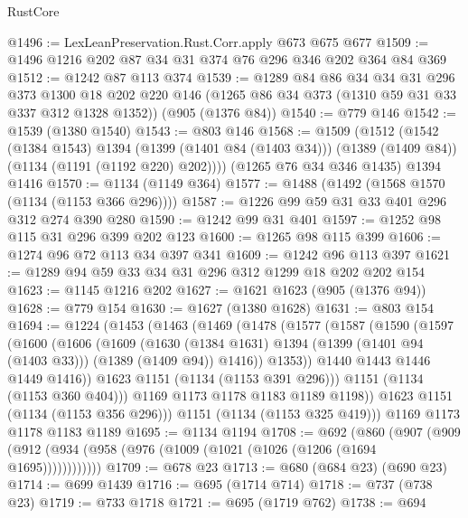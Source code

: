 \begin{lexlean}{RustCore}
\begin{coremodule}
@1496 := LexLeanPreservation.Rust.Corr.apply @673 @675 @677
@1509 := @1496 @1216 @202 @87 @34 @31 @374 @76 @296 @346 @202 @364 @84 @369
@1512 := @1242 @87 @113 @374
@1539 := @1289
    @84
    @86
    @34
    @34
    @31
    @296
    @373
    @1300
    @18
    @202
    @220
    @146
    (@1265 @86 @34 @373 (@1310 @59 @31 @33 @337 @312 @1328 @1352))
    (@905 (@1376 @84))
@1540 := @779 @146
@1542 := @1539 (@1380 @1540)
@1543 := @803 @146
@1568 := @1509
    (@1512
      (@1542
        (@1384 @1543)
        @1394
        (@1399 (@1401 @84 (@1403 @34)))
        (@1389 (@1409 @84))
        (@1134 (@1191 (@1192 @220) @202))))
    (@1265 @76 @34 @346 @1435)
    @1394
    @1416
@1570 := @1134 (@1149 @364)
@1577 := @1488 (@1492 (@1568 @1570 (@1134 (@1153 @366 @296))))
@1587 := @1226 @99 @59 @31 @33 @401 @296 @312 @274 @390 @280
@1590 := @1242 @99 @31 @401
@1597 := @1252 @98 @115 @31 @296 @399 @202 @123
@1600 := @1265 @98 @115 @399
@1606 := @1274 @96 @72 @113 @34 @397 @341
@1609 := @1242 @96 @113 @397
@1621 := @1289 @94 @59 @33 @34 @31 @296 @312 @1299 @18 @202 @202 @154
@1623 := @1145 @1216 @202
@1627 := @1621 @1623 (@905 (@1376 @94))
@1628 := @779 @154
@1630 := @1627 (@1380 @1628)
@1631 := @803 @154
@1694 := @1224
    (@1453
      (@1463
        (@1469
          (@1478
            (@1577
              (@1587
                (@1590
                  (@1597
                    (@1600
                      (@1606
                        (@1609
                          (@1630
                            (@1384 @1631)
                            @1394
                            (@1399 (@1401 @94 (@1403 @33)))
                            (@1389 (@1409 @94))
                            @1416))
                        @1353))
                    @1440
                    @1443
                    @1446
                    @1449
                    @1416))
                @1623
                @1151
                (@1134 (@1153 @391 @296)))
              @1151
              (@1134 (@1153 @360 @404)))
            @1169
            @1173
            @1178
            @1183
            @1189
            @1198))
        @1623
        @1151
        (@1134 (@1153 @356 @296)))
      @1151
      (@1134 (@1153 @325 @419)))
    @1169
    @1173
    @1178
    @1183
    @1189
@1695 := @1134 @1194
@1708 := @692
    (@860 (@907 (@909 (@912 (@934 (@958 (@976 (@1009 (@1021 (@1026 (@1206 (@1694 @1695))))))))))))
@1709 := @678 @23
@1713 := @680 (@684 @23) (@690 @23)
@1714 := @699 @1439
@1716 := @695 (@1714 @714)
@1718 := @737 (@738 @23)
@1719 := @733 @1718
@1721 := @695 (@1719 @762)
@1738 := @694

\end{coremodule}
\end{lexlean}
